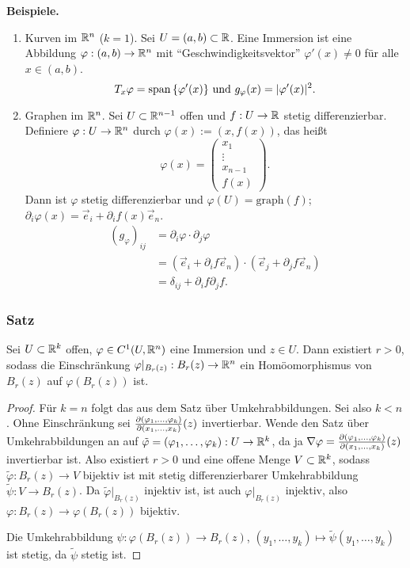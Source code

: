 \textbf{Beispiele.}
\begin{enumerate}
 \item Kurven im $\mathbb{R}^n$ ($k=1$). Sei $U = (a,b) \subset \mathbb{R}$. Eine Immersion ist eine Abbildung $\varphi:(a,b) \to \mathbb{R}^n$ mit ``Geschwindigkeitsvektor'' $\varphi'(x) \ne 0$ für alle $x \in (a,b)$.
 \[ T_x \varphi = \mathrm{span}\,\{ \varphi'(x)\} \text{ und } g_\varphi(x) = | \varphi'(x) |^2. \]
 \item Graphen im $\mathbb{R}^n$. Sei $U \subset \mathbb{R}^{n-1}$ offen und $f: U \to \mathbb{R}$ stetig differenzierbar. Definiere $\varphi: U \to \mathbb{R}^n$ durch $\varphi(x) := (x, f(x))$, das heißt 
 \[ \varphi(x) = \begin{pmatrix} x_1 \\ \vdots \\ x_{n-1} \\ f(x) \end{pmatrix}. \]
 Dann ist $\varphi$ stetig differenzierbar und $\varphi(U) =  \mathrm{graph}(f)$; $\partial_i \varphi(x) = \vec{e}_i + \partial_i f(x) \vec{e}_n$.
 \[ \begin{aligned}
     (g_\varphi)_{ij} &= \partial_i \varphi \cdot \partial_j \varphi \\
     &= (\vec{e}_i + \partial_i f \vec{e}_n) \cdot (\vec{e}_j + \partial_j f \vec{e}_n) \\
     &= \delta_{ij} + \partial_i f \partial_j f.
    \end{aligned} \]
\end{enumerate}

\subsubsection{Satz}
\begin{thm}
 Sei $U \subset \mathbb{R}^k$ offen, $\varphi \in C^1(U, \mathbb{R}^n)$ eine Immersion und $z \in U$. Dann existiert $r > 0$, sodass die Einschränkung $\varphi|_{B_r(z)} : B_r(z) \to \mathbb{R}^n$ ein Homöomorphismus von $B_r(z)$ auf $\varphi(B_r(z))$ ist.
\end{thm}

\begin{proof}
 Für $k = n$ folgt das aus dem Satz über Umkehrabbildungen. Sei also $k < n$. Ohne Einschränkung sei $\frac{\partial (\varphi_{1}, \ldots, \varphi_{k})}{\partial (x_1, \ldots, x_k)}(z)$ invertierbar. Wende den Satz über Umkehrabbildungen an auf $\tilde{\varphi} = ( \varphi_1, \ldots, \varphi_k): U \to \mathbb{R}^k$, da ja $\nabla \varphi = \frac{\partial (\varphi_{1}, \ldots, \varphi_{k})}{\partial (x_1, \ldots, x_k)}(z)$ invertierbar ist. Also existiert $r > 0$ und eine offene Menge $V \subset \mathbb{R}^k$, sodass $\tilde{\varphi}: B_r(z) \to V$ bijektiv ist mit stetig differenzierbarer Umkehrabbildung $\tilde{\psi}: V \to B_r(z)$. Da $\tilde{\varphi}|_{B_r(z)}$ injektiv ist, ist auch $\varphi|_{B_r(z)}$ injektiv, also $\varphi:B_r(z) \to \varphi(B_r(z))$ bijektiv.
 
 Die Umkehrabbildung $\psi : \varphi(B_r(z)) \to B_r(z)$, $(y_1, \ldots, y_k) \mapsto \tilde{\psi}(y_1, \ldots, y_k)$ ist stetig, da $\tilde{\psi}$ stetig ist.
\end{proof}

